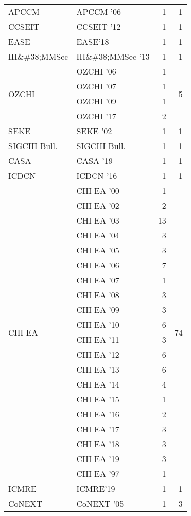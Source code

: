 \begin{table*}[t]
\begin{tabular}{llrr}
\multirow{1}{*}{APCCM } & APCCM '06 & 1 & \multirow{1}{*}{1}\\
\multirow{1}{*}{CCSEIT } & CCSEIT '12 & 1 & \multirow{1}{*}{1}\\
\multirow{1}{*}{EASE} & EASE'18 & 1 & \multirow{1}{*}{1}\\
\multirow{1}{*}{IH\&\#38;MMSec } & IH\&\#38;MMSec '13 & 1 & \multirow{1}{*}{1}\\
\multirow{4}{*}{OZCHI } & OZCHI '06 & 1 & \multirow{4}{*}{5}\\
& OZCHI '07 & 1 &\\
& OZCHI '09 & 1 &\\
& OZCHI '17 & 2 &\\
\multirow{1}{*}{SEKE } & SEKE '02 & 1 & \multirow{1}{*}{1}\\
\multirow{1}{*}{SIGCHI Bull.} & SIGCHI Bull. & 1 & \multirow{1}{*}{1}\\
\multirow{1}{*}{CASA } & CASA '19 & 1 & \multirow{1}{*}{1}\\
\multirow{1}{*}{ICDCN } & ICDCN '16 & 1 & \multirow{1}{*}{1}\\
\multirow{20}{*}{CHI EA } & CHI EA '00 & 1 & \multirow{20}{*}{74}\\
& CHI EA '02 & 2 &\\
& CHI EA '03 & 13 &\\
& CHI EA '04 & 3 &\\
& CHI EA '05 & 3 &\\
& CHI EA '06 & 7 &\\
& CHI EA '07 & 1 &\\
& CHI EA '08 & 3 &\\
& CHI EA '09 & 3 &\\
& CHI EA '10 & 6 &\\
& CHI EA '11 & 3 &\\
& CHI EA '12 & 6 &\\
& CHI EA '13 & 6 &\\
& CHI EA '14 & 4 &\\
& CHI EA '15 & 1 &\\
& CHI EA '16 & 2 &\\
& CHI EA '17 & 3 &\\
& CHI EA '18 & 3 &\\
& CHI EA '19 & 3 &\\
& CHI EA '97 & 1 &\\
\multirow{1}{*}{ICMRE} & ICMRE'19 & 1 & \multirow{1}{*}{1}\\
\multirow{3}{*}{CoNEXT } & CoNEXT '05 & 1 & \multirow{3}{*}{3}\\

\end{tabular}
\end{table*}
